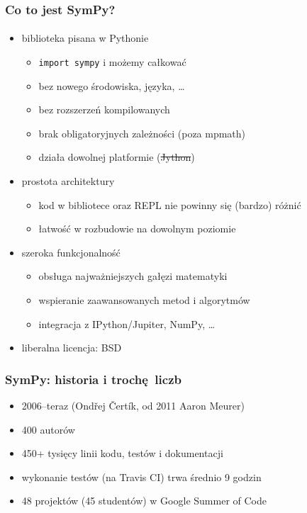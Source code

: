 \documentclass[10pt]{beamer}
\begin{document}
\begin{frame}
  \frametitle{Co to jest SymPy?}
  \framesubtitle{}

  \begin{itemize}
    \item biblioteka pisana w Pythonie
      \begin{itemize}
        \item \texttt{import sympy} i możemy całkować
        \item bez nowego środowiska, języka, \ldots
        \item bez rozszerzeń kompilowanych
        \item brak obligatoryjnych zależności (poza mpmath)
        \item działa dowolnej platformie (\sout{Jython})
      \end{itemize}
    \item prostota architektury
      \begin{itemize}
        \item kod w bibliotece oraz REPL nie powinny się (bardzo) różnić
        \item łatwość w rozbudowie na dowolnym poziomie
      \end{itemize}
    \item szeroka funkcjonalność
      \begin{itemize}
        \item obsługa najważniejszych gałęzi matematyki
        \item wspieranie zaawansowanych metod i algorytmów
        \item integracja z IPython/Jupiter, NumPy, \ldots
      \end{itemize}
    \item liberalna licencja: BSD
  \end{itemize}
\end{frame}

\begin{frame}[fragile]
  \frametitle{SymPy: historia i trochę liczb}

  \begin{itemize}
    \item 2006--teraz (Ondřej Čertík, od 2011 Aaron Meurer)
    \item 400 autorów
    \item 450+ tysięcy linii kodu, testów i dokumentacji
    \item wykonanie testów (na Travis CI) trwa średnio 9 godzin
    \item 48 projektów (45 studentów) w Google Summer of Code
  \end{itemize}
\end{frame}
\end{document}
